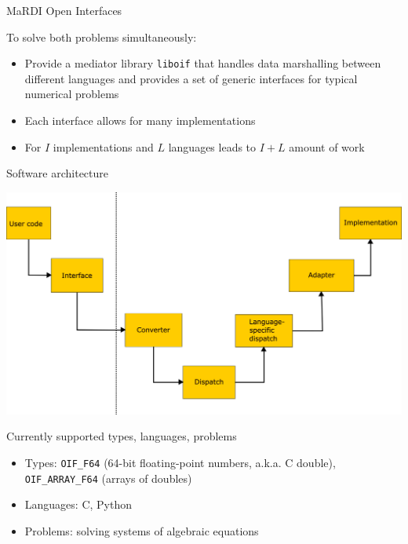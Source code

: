 \documentclass[10pt, aspectratio=169, progressbar=frametitle]{beamer}
\begin{document}
\begin{frame}{MaRDI Open Interfaces}
  \begin{minipage}{0.45\textwidth}
    To solve both problems simultaneously:
    \begin{itemize}
      \item Provide a mediator library \texttt{liboif} that handles
            data marshalling between different languages and provides a set
            of generic interfaces for typical numerical problems
      \item Each interface allows for many implementations
      \item For $I$ implementations and $L$ languages leads to $I + L$
            amount of work
    \end{itemize}
  \end{minipage}\hfill%
  \begin{minipage}{0.50\textwidth}
    
  \end{minipage}
\end{frame}

\begin{frame}{Software architecture}
  \begin{center}
    \includegraphics[scale=0.09]{arch.png}
  \end{center}
\end{frame}

\begin{frame}{Currently supported types, languages, problems}
  \begin{itemize}
    \item Types: \texttt{OIF\_F64} (64-bit floating-point numbers, a.k.a. C double),
      \texttt{OIF\_ARRAY\_F64} (arrays of doubles)
    \item Languages: C, Python
    \item Problems: solving systems of algebraic equations
  \end{itemize}
\end{frame}
\end{document}
